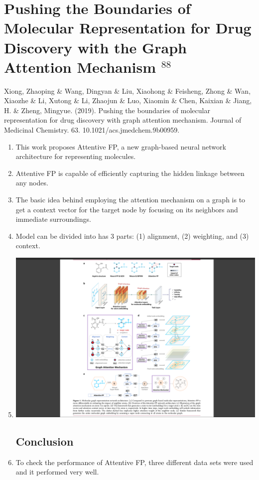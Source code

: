 \documentclass[]{report}
\begin{document}
\section{Pushing the Boundaries of Molecular Representation for Drug Discovery with the Graph Attention Mechanism $^{88}$}
Xiong, Zhaoping \& Wang, Dingyan \& Liu, Xiaohong \& Feisheng, Zhong \& Wan, Xiaozhe \& Li, Xutong \& Li, Zhaojun \& Luo, Xiaomin \& Chen, Kaixian \& Jiang, H. \& Zheng, Mingyue. (2019). Pushing the boundaries of molecular representation for drug discovery with graph attention mechanism. Journal of Medicinal Chemistry. 63. 10.1021/acs.jmedchem.9b00959. 
\begin{enumerate}
	\subsection{Introduction}
	\item This work proposes Attentive FP, a new graph-based neural network architecture for representing molecules.
	\item Attentive FP is capable of efficiently capturing the hidden linkage between any nodes.
	\item The basic idea behind employing the attention mechanism on a graph is to get a context vector for the target node by focusing on its neighbors and immediate surroundings.
	\item Model can be divided into has 3 parts: (1) alignment, (2) weighting, and (3) context.
	\item 	\includegraphics[width=\linewidth]{AttentiveFP}
	\subsection{Conclusion}
	\item To check the performance of Attentive FP, three different data sets were used and it performed very well.
\end{enumerate}
\end{document}
